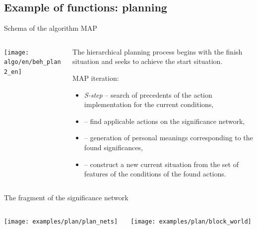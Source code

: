 \documentclass[default]{beamer}
\begin{document}
	\subsection{Example of functions: planning}
	\begin{frame}{Schema of the algorithm MAP}
		
		\begin{columns}
			\begin{column}{0.55\textwidth}
				\texttt{[image: algo/en/beh\_plan2\_en]}
				\vspace{-5pt}
				\nocite{*}
				\printbibliography[keyword={plan}, resetnumbers=true]
			\end{column}
			\begin{column}{0.45\textwidth}
				\small
				The hierarchical planning process begins with the finish situation and seeks to achieve the start situation.
				\par\bigskip
				MAP iteration:
				\begin{itemize}
					\item \textit{S-step} -- search of precedents of the action implementation for the current conditions,
					\item {} -- find applicable actions on the significance network,
					\item {} -- generation of personal meanings corresponding to the found significances,
					\item {} -- construct a new current situation from the set of features of the conditions of the found actions.
					
				\end{itemize}
			\end{column}
		\end{columns}
		
	\end{frame}		

	\begin{frame}{The fragment of the significance network}
		\begin{columns}
		\begin{column}{0.7\textwidth}
			\centering
			\texttt{[image: examples/plan/plan\_nets]}
		\end{column}
		\begin{column}{0.3\textwidth}
			\centering
			\texttt{[image: examples/plan/block\_world]}
		\end{column}
		\end{columns}
	\end{frame}	
	
\end{document}

